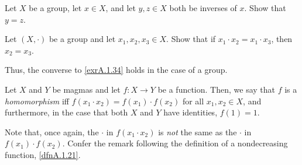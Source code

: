 \begin{exr}\label{exrA.1.79}
Let $X$ be a group, let $x\in X$, and let $y,z\in X$ both be inverses of $x$.  Show that $y=z$.
\end{exr}
\begin{exr}
Let $(X,\cdot )$ be a group and let $x_1,x_2,x_3\in X$.  Show that if $x_1\cdot x_2=x_1\cdot x_3$, then $x_2=x_3$.
\begin{rmk}
Thus, the converse to \cref{exrA.1.34} holds in the case of a group.
\end{rmk}
\end{exr}
\begin{dfn}
Let $X$ and $Y$ be magmas and let $f:X\rightarrow Y$ be a function.  Then, we say that $f$ is a \emph{homomorphism} iff $f(x_1\cdot x_2)=f(x_1)\cdot f(x_2)$ for all $x_1,x_2\in X$, and furthermore, in the case that both $X$ and $Y$ have identities, $f(1)=1$.
\begin{rmk}
Note that, once again, the $\cdot$ in $f(x_1\cdot x_2)$ is \emph{not} the same as the $\cdot$ in $f(x_1)\cdot f(x_2)$.  Confer the remark following the definition of a nondecreasing function, \cref{dfnA.1.21}.
\end{rmk}
\end{dfn}

